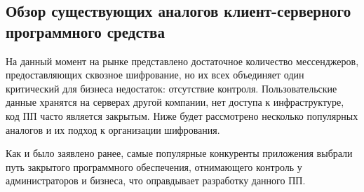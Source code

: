 \subsection{Обзор существующих аналогов клиент-серверного программного средства}
\label{sec:analysis:research:analogs}

На данный момент на рынке представлено достаточное количество мессенджеров, предоставляющих сквозное шифрование, но их всех объединяет один критический для бизнеса недостаток: отсутствие контроля. 
Пользовательские данные хранятся на серверах другой компании, нет доступа к инфраструктуре, код ПП часто является закрытым. Ниже будет рассмотрено несколько популярных аналогов и их подход к организации шифрования.




Как и было заявлено ранее, самые популярные конкуренты приложения выбрали путь закрытого программного обеспечения, отнимающего контроль у администраторов и бизнеса, что оправдывает разработку данного ПП.